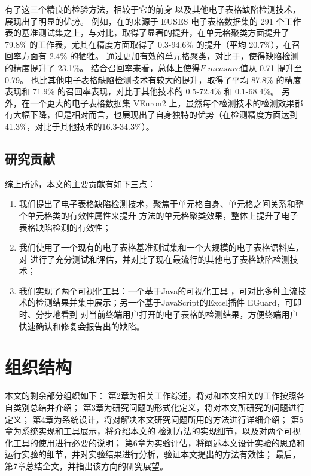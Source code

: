 有了这三个精良的检验方法，\wa 相较于它的前身 \cu 以及其他电子表格缺陷检测技术，展现出了明显的优势。
例如，在\cu 的来源于 EUSES \cite{fisher2005euses} 电子表格数据集的 291 个工作表的基准测试集之上，\wa 与\cu 对比，取得了显著的提升，在单元格聚类方面提升了 79.8\% 的工作表，尤其在精度方面取得了 0.3-94.6\% 的提升（平均 20.7\%），在召回率方面有 2.4\% 的牺牲。
\wa 通过更加有效的单元格聚类，对比于\cu，使得缺陷检测的精度提升了 23.1\%。
结合召回率来看，总体上使得$F\text{-}measure$值从 0.71 提升至 0.79。
\wa 也比其他电子表格缺陷检测技术有较大的提升，取得了平均 87.8\% 的精度表现和 71.9\% 的召回率表现，对比于其他技术的 0.5-72.4\% 和 0.1-68.4\%。
另外，在一个更大的电子表格数据集 VEnron2 \cite{xu2017spreadcluster} 上，虽然每个检测技术的检测效果都有大幅下降，但是相对而言，\wa 也展现出了自身独特的优势（在检测精度方面达到 41.3\%，对比于其他技术的16.3-34.3\%）。

\subsection{研究贡献}

综上所述，本文的主要贡献有如下三点：

\begin{enumerate}
    \item 我们提出了电子表格缺陷检测技术\wa ，聚焦于单元格自身、单元格之间关系和整个单元格类的有效性属性来提升 \cu 方法的单元格聚类效果，整体上提升了电子表格缺陷检测的有效性；
    \item 我们使用了一个现有的电子表格基准测试集和一个大规模的电子表格语料库，对 \wa 进行了充分测试和评估，并对比了现在最流行的其他电子表格缺陷检测技术；
    \item 我们实现了两个可视化工具：一个基于Java的可视化工具 \sg ，可对比多种主流技术的检测结果并集中展示；另一个基于JavaScript的Excel插件 EGuard，可即时、分步地看到 \wa 对当前终端用户打开的电子表格的检测结果，方便终端用户快速确认和修复会报告出的缺陷。
\end{enumerate}


\section{组织结构}

本文的剩余部分组织如下：
第2章为相关工作综述，将对和本文相关的工作按照各自类别总结并介绍；
第3章为研究问题的形式化定义，将对本文所研究的问题进行定义；
第4章为系统设计，将对解决本文研究问题所用的方法进行详细介绍；
第5章为系统实现和工具展示，将介绍本文的 \wa 检测方法的实现细节，以及对两个可视化工具的使用进行必要的说明；
第6章为实验评估，将阐述本文设计实验的思路和运行实验的细节，并对实验结果进行分析，验证本文提出的方法有效性；
最后，第7章总结全文，并指出该方向的研究展望。